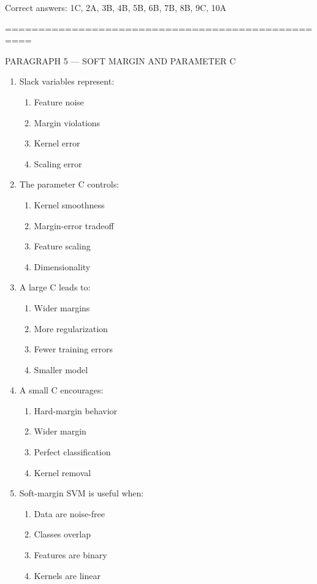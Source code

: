 \documentclass{article}
\begin{document}
	Correct answers: 1C, 2A, 3B, 4B, 5B, 6B, 7B, 8B, 9C, 10A
	
	\bigskip
	==================================================
	
	PARAGRAPH 5 — SOFT MARGIN AND PARAMETER C
	
	\begin{enumerate}
		\item Slack variables represent:
		\begin{enumerate}
			\item Feature noise
			\item Margin violations
			\item Kernel error
			\item Scaling error
		\end{enumerate}
		
		\item The parameter C controls:
		\begin{enumerate}
			\item Kernel smoothness
			\item Margin-error tradeoff
			\item Feature scaling
			\item Dimensionality
		\end{enumerate}
		
		\item A large C leads to:
		\begin{enumerate}
			\item Wider margins
			\item More regularization
			\item Fewer training errors
			\item Smaller model
		\end{enumerate}
		
		\item A small C encourages:
		\begin{enumerate}
			\item Hard-margin behavior
			\item Wider margin
			\item Perfect classification
			\item Kernel removal
		\end{enumerate}
		
		\item Soft-margin SVM is useful when:
		\begin{enumerate}
			\item Data are noise-free
			\item Classes overlap
			\item Features are binary
			\item Kernels are linear
		\end{enumerate}
		

\end{enumerate}
\end{document}
